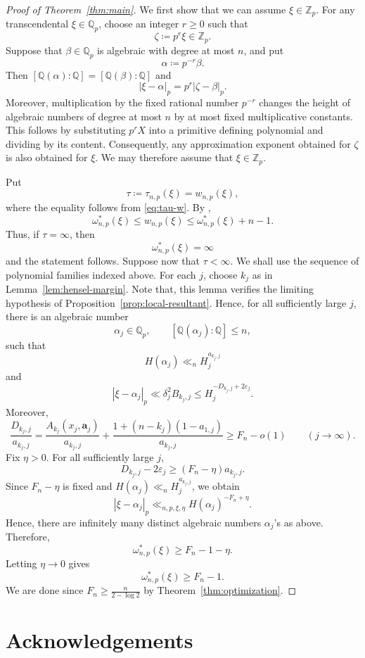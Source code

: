 \documentclass[12pt,reqno]{amsart}
\theoremstyle{definition}
\theoremstyle{remark}
\newcommand{\Q}{\mathbb Q}
\newcommand{\Z}{\mathbb Z}
\newcommand{\Qp}{\mathbb Q_p}
\newcommand{\Zp}{\mathbb Z_p}
\begin{document}
\begin{proof}[Proof of Theorem~\ref{thm:main}]
We first show that we can assume $\xi\in\Z_p$. For any transcendental $\xi\in\Q_p$, choose an integer $r\geq0$ such that
$$
\zeta\coloneqq p^r\xi\in\Zp.
$$
Suppose that $\beta\in\Qp$ is algebraic with degree at most $n$, and put
$$
\alpha\coloneqq p^{-r}\beta.
$$
Then $[\Q(\alpha):\Q]=[\Q(\beta):\Q]$ and
$$
|\xi-\alpha|_p=p^r|\zeta-\beta|_p.
$$
Moreover, multiplication by the fixed rational number $p^{-r}$ changes the
height of algebraic numbers of degree at most $n$ by at most fixed
multiplicative constants. This follows by substituting $p^rX$ into a
primitive defining polynomial and dividing by its content. Consequently, any
approximation exponent obtained for $\zeta$ is also obtained for $\xi$.
We may therefore assume that $\xi\in\Zp$. 

Put
$$
\tau\coloneqq\tau_{n,p}(\xi)=w_{n,p}(\xi),
$$
where the equality follows from \eqref{eq:tau-w}. By
\cite[Theorem~9.3]{BugeaudBook},
$$
\omega^*_{n,p}(\xi)\leq w_{n,p}(\xi)
\leq\omega^*_{n,p}(\xi)+n-1.
$$
Thus, if $\tau=\infty$, then
$$
\omega^*_{n,p}(\xi)=\infty
$$
and the statement follows. Suppose now that $\tau<\infty$. We shall use the sequence of polynomial families indexed above. For each $j$, choose $k_j$
as in Lemma~\ref{lem:hensel-margin}. Note that, this lemma verifies the limiting
hypothesis of Proposition~\ref{prop:local-resultant}. Hence, for all
sufficiently large $j$, there is an algebraic number
$$
\alpha_j\in\Qp,
\qquad [\Q(\alpha_j):\Q]\leq n,
$$
such that
$$
H(\alpha_j)\ll_nH_j^{a_{k_j,j}}
$$
and
$$
|\xi-\alpha_j|_p
\ll
\delta_j^2B_{k_j,j}
\leq H_j^{-D_{k_j,j}+2\varepsilon_j}.
$$
Moreover,
$$
\frac{D_{k_j,j}}{a_{k_j,j}}
=
\frac{A_{k_j}(x_j,\mathbf a_j)}{a_{k_j,j}}
+
\frac{1+(n-k_j)(1-a_{1,j})}{a_{k_j,j}}
\geq F_n-o(1)\qquad(j\to\infty).
$$
Fix $\eta>0$. For all sufficiently large $j$,
$$
D_{k_j,j}-2\varepsilon_j\geq(F_n-\eta)a_{k_j,j}.
$$
Since $F_n-\eta$ is fixed and
$H(\alpha_j)\ll_nH_j^{a_{k_j,j}}$, we obtain
$$
|\xi-\alpha_j|_p
\ll_{n,p,\xi,\eta}
H(\alpha_j)^{-F_n+\eta}.
$$
Hence, there are infinitely many distinct algebraic numbers $\alpha_j$'s as above. Therefore,
$$
\omega^*_{n,p}(\xi)\geq F_n-1-\eta.
$$
Letting $\eta\to0$ gives
$$
\omega^*_{n,p}(\xi)\geq F_n-1.
$$
We are done since $F_n\geq \frac{n}{2-\log 2}$ by Theorem~\ref{thm:optimization}.
\end{proof}

\bigskip
\section*{\bf Acknowledgements}
\bigskip
\end{document}
